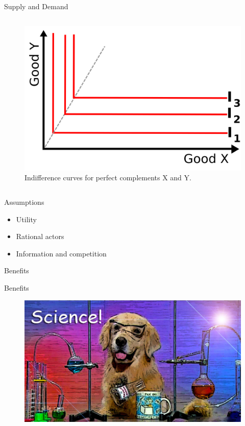 \documentclass{beamer}
\begin{document}
\begin{frame}{Supply and Demand}
\begin{columns}[onlytextwidth]
	\begin{figure}[htpb]
		\centering
		\includegraphics[width=0.8\linewidth]{../img/indifferent3.png}
		\caption{Indifference curves for perfect complements X and Y.}
		\label{fig:indif3}
	\end{figure}

\end{columns}
\end{frame}

\begin{frame}{Assumptions}
    \begin{itemize}[<+- | alert@+>]
    \item Utility %
    \item Rational actors
    \item Information and competition
    \end{itemize}
\end{frame}{}

\begin{frame}{Benefits}
\end{frame}

\begin{frame}{Benefits}
	\begin{figure}[htpb]
		\centering
		\includegraphics[width=0.8\linewidth]{../img/science.jpeg}
	\end{figure}
\end{frame}
\end{document}

